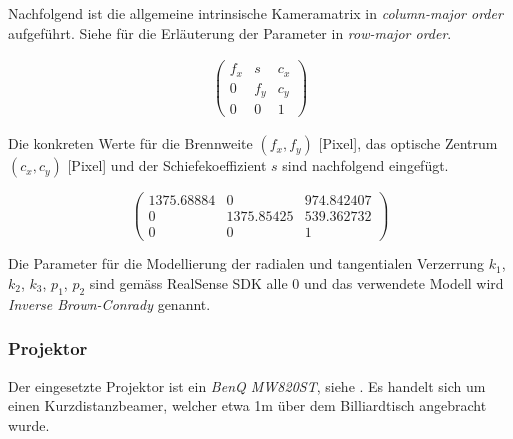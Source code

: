 Nachfolgend ist die allgemeine intrinsische Kameramatrix in \emph{column-major order} aufgeführt.
Siehe \cite{matlab:what_is_camera_calibration} für die Erläuterung der Parameter in \emph{row-major order}.

\begin{align}
    \begin{pmatrix}
        f_x & s   & c_x\\
        0   & f_y & c_y\\
        0   & 0   & 1
    \end{pmatrix}
\end{align}

Die konkreten Werte für die Brennweite $(f_x, f_y)$ [Pixel], das optische Zentrum $(c_x, c_y)$ [Pixel]
und der Schiefekoeffizient $s$ sind nachfolgend eingefügt.

\begin{equation}
    \begin{pmatrix}
        1375.68884 & 0          & 974.842407\\
        0          & 1375.85425 & 539.362732\\
        0          & 0          & 1
    \end{pmatrix}
\end{equation}

Die Parameter für die Modellierung der radialen und tangentialen Verzerrung $k_1$, $k_2$, $k_3$, $p_1$, $p_2$ sind gemäss
RealSense SDK alle 0 und das verwendete Modell wird \emph{Inverse Brown-Conrady} genannt.

\subsubsection{Projektor}\label{kap:projector}

Der eingesetzte Projektor ist ein \emph{BenQ MW820ST}, siehe \cite{projectorcentral:benq_mw820st}.
Es handelt sich um einen Kurzdistanzbeamer, welcher etwa 1\si{\metre} über dem Billiardtisch angebracht wurde.
